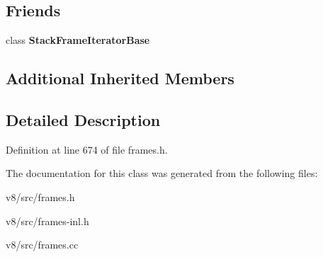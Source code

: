 \subsection*{Friends}
\begin{DoxyCompactItemize}
\item 
\mbox{\label{classv8_1_1internal_1_1JavaScriptFrame_ac7310421866976ca454bbe11c5f926c3}} 
class {\bfseries Stack\+Frame\+Iterator\+Base}
\end{DoxyCompactItemize}
\subsection*{Additional Inherited Members}


\subsection{Detailed Description}


Definition at line 674 of file frames.\+h.



The documentation for this class was generated from the following files\+:\begin{DoxyCompactItemize}
\item 
v8/src/frames.\+h\item 
v8/src/frames-\/inl.\+h\item 
v8/src/frames.\+cc\end{DoxyCompactItemize}
